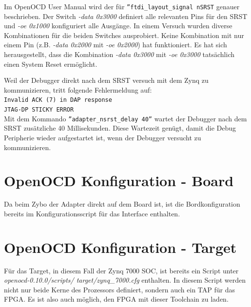 Im OpenOCD User Manual\cite{bib:OpenOCDDoku} wird der für \texttt{''ftdi\_layout\_signal nSRST} genauer beschrieben.
Der Switch \textit{-data 0x3000} definiert alle relevanten Pins für den SRST und \textit{-oe 0x1000} konfiguriert alle Ausgänge.
In einem Versuch wurden diverse Kombinationen für die beiden Switches ausprobiert.
Keine Kombination mit nur einem Pin (z.B. \textit{-data 0x2000} mit \textit{-oe 0x2000}) hat funktioniert.
Es hat sich herausgestellt, dass die Kombination \textit{-data 0x3000} mit \textit{-oe 0x3000} tatsächlich einen System Reset ermöglicht.

Weil der Debugger direkt nach dem SRST versuch mit dem Zynq zu kommunizieren, tritt folgende Fehlermeldung auf:\\
\texttt{Invalid ACK (7) in DAP response\\
JTAG-DP STICKY ERROR}\\
Mit dem Kommando \texttt{''adapter\_nsrst\_delay 40''} wartet der Debugger nach dem SRST zusätzliche 40 Millisekunden.
Diese Wartezeit genügt, damit die Debug Peripherie wieder aufgestartet ist, wenn der Debugger versucht zu kommunizieren.



\section{OpenOCD Konfiguration - Board}
Da beim Zybo der Adapter direkt auf dem Board ist, ist die Bordkonfiguration bereits im Konfigurationsscript für das Interface enthalten.

\section{OpenOCD Konfiguration - Target}
Für das Target, in diesem Fall der Zynq 7000 SOC, ist bereits ein Script unter \textit{openocd-0.10.0/scripts/ target/zynq\_7000.cfg} enthalten.
In diesem Script werden nicht nur beide Kerne des Prozessors definiert, sondern auch ein TAP für das FPGA.
Es ist also auch möglich, den FPGA mit dieser Toolchain zu laden.

